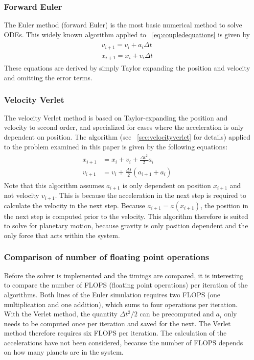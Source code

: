 \documentclass[aps,reprint]{revtex4-1}
\begin{document}
\subsubsection{Forward Euler}
The Euler method (forward Euler) is the most basic numerical method to solve
ODEs. This widely known algorithm applied to ~\ref{eq:coupledequations} is given by
\begin{align*}
  \begin{split}
  v_{i+1} = v_{i} + a_{i}\Delta{t} \\
  x_{i+1} = x_{i} + v_{i}\Delta{t}
\end{split}
\end{align*}
These equations are derived by simply Taylor expanding the position and velocity
and omitting the error terms.
\subsubsection{Velocity Verlet}
The velocity Verlet method is based on Taylor-expanding the position and velocity
to second order, and specialized for cases where the acceleration is only
dependent on position. The algorithm (see ~\ref{sec:velocityverlet} for details)
applied to the problem examined in this paper is given by the following equations:
\begin{align}
  \begin{split}
    x_{i+1} &= x_i + v_i + \frac{\Delta{t}^2}{2} a_i \\
    v_{i+1} &= v_i + \frac{\Delta{t}}{2}(a_{i+1} + a_{i})
  \end{split}
\end{align}
Note that this algorithm assumes $a_{i+1}$ is only dependent on position $x_{i+1}$
and not velocity $v_{i+1}$. This is because the acceleration in the next step
is required to calculate the velocity in the next step. Because $a_{i+1} = a(x_{i+1})$,
the position in the next step is computed prior to the velocity. This algorithm
therefore is suited to solve for planetary motion, because gravity is only
position dependent and the only force that acts within the system.
\subsubsection{Comparison of number of floating point operations}
Before the solver is implemented and the timings are compared, it is interesting
to compare the number of FLOPS (floating point operations) per iteration of the
algorithms. Both lines of the Euler simulation requires two FLOPS (one
multiplication and one addition), which sums to four operations per iteration.
With the Verlet method, the quantity $\Delta{t}^2 / 2$ can be precomputed and
$a_{i}$ only needs to be computed once per iteration and saved for the next.
The Verlet method therefore requires six FLOPS per iteration. The calculation
of the accelerations have not been considered, because the number of FLOPS depends
on how many planets are in the system.
\end{document}
